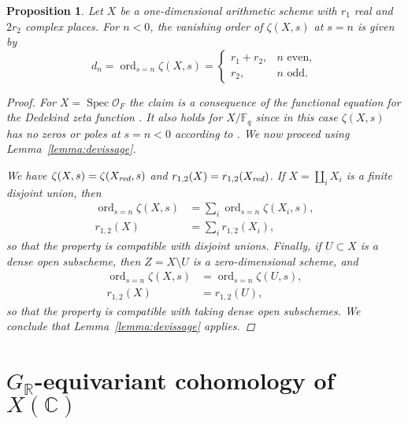 \documentclass[draft]{article}
\DeclareMathOperator{\ord}{ord}
\DeclareMathOperator{\Spec}{Spec}
\newcommand{\CC}{\mathbb{C}}
\newcommand{\FF}{\mathbb{F}}
\newcommand{\RR}{\mathbb{R}}
\newcommand{\red}{\text{\it red}}
\theoremstyle{myplain}
\newtheorem{proposition}[theorem]{Proposition}
\theoremstyle{mydefinition}
\begin{document}
\begin{proposition}
  \label{prop:vanishing-order-equals-dn}
  Let $X$ be a one-dimensional arithmetic scheme with $r_1$ real and $2r_2$
  complex places. For $n < 0$, the vanishing order of $\zeta (X,s)$ at $s = n$
  is given by
  \begin{equation}
    \label{eqn:dn}
    d_n = \ord_{s = n} \zeta (X,s) =
    \begin{cases}
      r_1 + r_2, & n\text{ even}, \\
      r_2, & n\text{ odd}.
    \end{cases}
  \end{equation}

  \begin{proof}
    For $X = \Spec \mathcal{O}_F$ the claim is a consequence of the functional
    equation for the Dedekind zeta function \cite[\S VII.5]{Neukirch-1999}.
    It also holds for $X/\FF_q$ since in this case $\zeta (X,s)$ has no zeros or
    poles at $s = n < 0$ according to \cite[pp.\,26--27]{Katz-1994}.
    We now proceed using Lemma~\ref{lemma:devissage}.

    We have $\zeta (X,s) = \zeta (X_\red,s)$ and
    $r_{1,2} (X) = r_{1,2} (X_\red)$.
    If $X = \coprod_i X_i$ is a finite disjoint union, then
    \begin{align*}
      \ord_{s = n} \zeta (X,s) & = \sum_i \ord_{s = n} \zeta (X_i,s), \\
      r_{1,2} (X) & = \sum_i r_{1,2} (X_i),
    \end{align*}
    so that the property is compatible with disjoint unions. Finally, if
    $U \subset X$ is a dense open subscheme, then $Z = X\setminus U$ is a
    zero-dimensional scheme, and
    \begin{align*}
      \ord_{s = n} \zeta (X,s) & = \ord_{s = n} \zeta (U,s), \\
      r_{1,2} (X) & = r_{1,2} (U),
    \end{align*}
    so that the property is compatible with taking dense open subschemes.
    We conclude that Lemma~\ref{lemma:devissage} applies.
  \end{proof}
\end{proposition}


\section{$G_\RR$-equivariant cohomology of $X(\CC)$}
\label{sec:GR-equivariant-cohomology}
\end{document}
